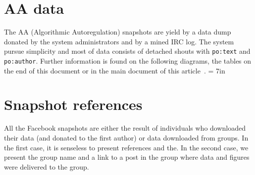 \documentclass[review]{elsarticle}
\newcommand{\textttt}[1] {\texttt{\footnotesize#1}}
\begin{document}

\section{AA data}
The AA (Algorithmic Autoregulation) snapshots are yield by a data dump donated by the system
administrators and by a mined IRC log.
The system pursue simplicity and most of data consists of detached
shouts with \textttt{po:text} and \textttt{po:author}.
Further information is found on the following diagrams, the tables on
the end of this document or in the main document of this
article~\cite{losd}.
\textheight = 7in
\pdfpageheight \foobar
{}

\section{Snapshot references}
\label{sreferences}
\pdfpageheight 10in
All the Facebook snapshots are either the result of individuals who downloaded
their data (and donated to the first author) or data downloaded from groups.
In the first case, it is senseless to present references and the. In the second
case, we present the group name and a link to a post in the group where
data and figures were delivered to the group.
\end{document}
